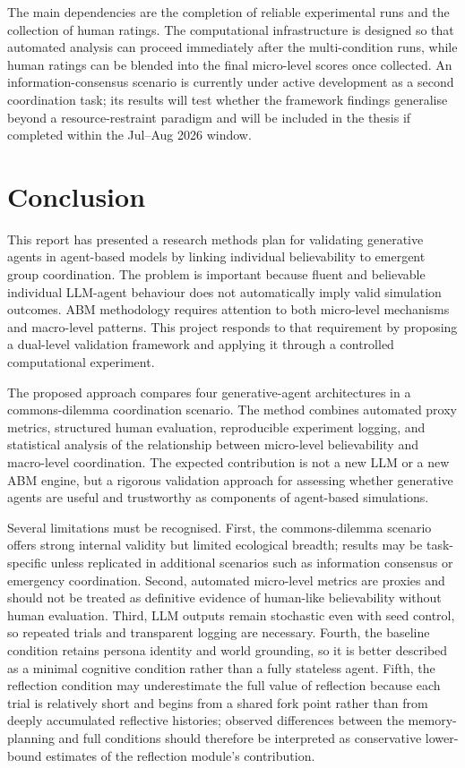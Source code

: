 \documentclass[11pt]{article}
\begin{document}
The main dependencies are the completion of reliable experimental runs and the collection of human ratings. The computational infrastructure is designed so that automated analysis can proceed immediately after the multi-condition runs, while human ratings can be blended into the final micro-level scores once collected. An information-consensus scenario is currently under active development as a second coordination task; its results will test whether the framework findings generalise beyond a resource-restraint paradigm and will be included in the thesis if completed within the Jul--Aug 2026 window.

\section{Conclusion}
This report has presented a research methods plan for validating generative agents in agent-based models by linking individual believability to emergent group coordination. The problem is important because fluent and believable individual LLM-agent behaviour does not automatically imply valid simulation outcomes. ABM methodology requires attention to both micro-level mechanisms and macro-level patterns. This project responds to that requirement by proposing a dual-level validation framework and applying it through a controlled computational experiment.

The proposed approach compares four generative-agent architectures in a commons-dilemma coordination scenario. The method combines automated proxy metrics, structured human evaluation, reproducible experiment logging, and statistical analysis of the relationship between micro-level believability and macro-level coordination. The expected contribution is not a new LLM or a new ABM engine, but a rigorous validation approach for assessing whether generative agents are useful and trustworthy as components of agent-based simulations.

Several limitations must be recognised. First, the commons-dilemma scenario offers strong internal validity but limited ecological breadth; results may be task-specific unless replicated in additional scenarios such as information consensus or emergency coordination. Second, automated micro-level metrics are proxies and should not be treated as definitive evidence of human-like believability without human evaluation. Third, LLM outputs remain stochastic even with seed control, so repeated trials and transparent logging are necessary. Fourth, the baseline condition retains persona identity and world grounding, so it is better described as a minimal cognitive condition rather than a fully stateless agent. Fifth, the reflection condition may underestimate the full value of reflection because each trial is relatively short and begins from a shared fork point rather than from deeply accumulated reflective histories; observed differences between the memory-planning and full conditions should therefore be interpreted as conservative lower-bound estimates of the reflection module's contribution.
\end{document}
